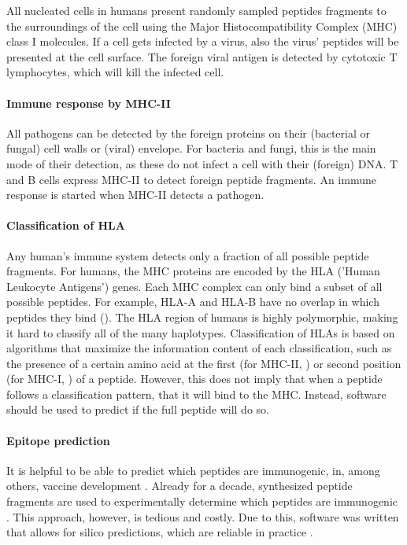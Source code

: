 All nucleated cells in humans present randomly sampled peptides
fragments to the surroundings of the cell using the Major 
Histocompatibility Complex (MHC) class I molecules.
If a cell gets infected by a virus, also the virus' peptides
will be presented at the cell surface. The foreign viral antigen is detected 
by cytotoxic T lymphocytes, which will kill the infected cell.

\paragraph{Immune response by MHC-II}

All pathogens can be detected by the foreign proteins on 
their (bacterial or fungal) cell walls or (viral) envelope.
For bacteria and fungi, this is the main mode of their detection,
as these do not infect a cell with their (foreign) DNA.
T and B cells express MHC-II to detect foreign peptide fragments.
An immune response is started when MHC-II detects a pathogen.

\paragraph{Classification of HLA}

Any human's immune system detects only a fraction of all possible
peptide fragments.
For humans, the MHC proteins are encoded by the
HLA ('Human Leukocyte Antigens') genes.
Each MHC complex can only bind a subset of all possible peptides.
For example, HLA-A and HLA-B have no overlap in which
peptides they bind (\cite{lund2004definition}).
The HLA region of humans is highly polymorphic, 
making it hard to classify all of the many haplotypes.
Classification of HLAs is based on algorithms that
maximize the information content of each 
classification, such as the presence of a certain amino acid at 
the first (for MHC-II, \cite{southwood1998several})
or second position (for MHC-I, \cite{lund2004definition}) of a peptide.
However, this does not imply that when a peptide follows
a classification pattern, that it will bind to the MHC. 
Instead, software should be used to predict if the
full peptide will do so.

\paragraph{Epitope prediction}

It is helpful to be able to predict which peptides are immunogenic,
in, among others, vaccine development . 
Already for a decade, synthesized peptide fragments are used
to experimentally determine which peptides
are immunogenic .
This approach, however, is tedious and costly.
Due to this, software was written that allows for silico 
predictions, which are reliable in 
practice \cite{larsen2010identification,schellens2008unanticipated,tang2011genome}.
 
